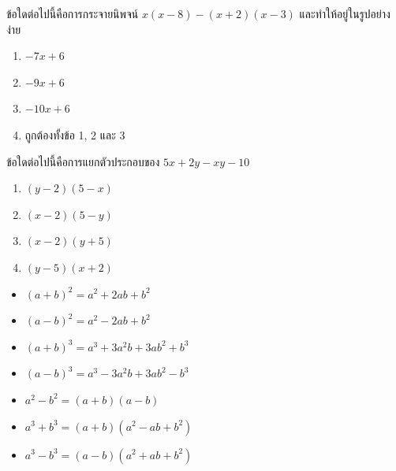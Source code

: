 \newpage
\begin{examplebox}
ข้อใดต่อไปนี้คือการกระจายนิพจน์ $x(x-8)-(x+2)(x-3)$ และทำให้อยู่ในรูปอย่างง่าย
\begin{enumerate}
\item $-7 x+6$
\item $-9 x+6$
\item $-10 x+6$
\item ถูกต้องทั้งข้อ 1, 2 และ 3
\end{enumerate}
\end{examplebox}

\newpage
\begin{examplebox}
ข้อใดต่อไปนี้คือการแยกตัวประกอบของ $5 x+2 y-x y-10$
\begin{enumerate}
\item $(y-2)(5-x)$
\item $(x-2)(5-y)$
\item $(x-2)(y+5)$
\item $(y-5)(x+2)$
\end{enumerate}
\end{examplebox}

\newpage
\begin{remarkbox}
\begin{itemize}
    \item[*] $(a+b)^2=a^2+2ab+b^2$
    \item[*] $(a-b)^2=a^2-2ab+b^2$
    \item[*] $(a+b)^3=a^3+3a^2b+3ab^2+b^3$
    \item[*] $(a-b)^3=a^3-3a^2b+3ab^2-b^3$
    \item[*] $a^2-b^2=(a+b)(a-b)$
    \item[*] $a^3+b^3=(a+b)(a^2-ab+b^2)$
    \item[*] $a^3-b^3=(a-b)(a^2+ab+b^2)$
\end{itemize}   
\end{remarkbox}

